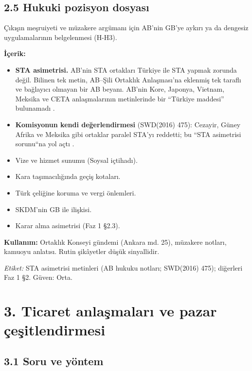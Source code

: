 \hypertarget{02c_hazirlik-25-hukuki-pozisyon-dosyasux131}{%
\subsection{2.5 Hukuki pozisyon dosyası}\label{02c_hazirlik-25-hukuki-pozisyon-dosyasux131}}

Çıkışın meşruiyeti ve müzakere argümanı için AB'nin GB'ye aykırı ya da dengesiz uygulamalarının belgelenmesi (H-H3).

\textbf{İçerik:}

\begin{itemize}
\tightlist
\item
  \textbf{STA asimetrisi.} AB'nin STA ortakları Türkiye ile STA yapmak zorunda değil. Bilinen tek metin, AB--Şili Ortaklık Anlaşması'na eklenmiş tek taraflı ve bağlayıcı olmayan bir AB beyanı. AB'nin Kore, Japonya, Vietnam, Meksika ve CETA anlaşmalarının metinlerinde bir ``Türkiye maddesi'' bulunamadı \etiketV{}.
\item
  \textbf{Komisyonun kendi değerlendirmesi} (SWD(2016) 475): Cezayir, Güney Afrika ve Meksika gibi ortaklar paralel STA'yı reddetti; bu ``STA asimetrisi sorunu``na yol açtı \etiketV{}.
\item
  Vize ve hizmet sunumu (Soysal içtihadı).
\item
  Kara taşımacılığında geçiş kotaları.
\item
  Türk çeliğine koruma ve vergi önlemleri.
\item
  SKDM'nin GB ile ilişkisi.
\item
  Karar alma asimetrisi (Faz 1 §2.3).
\end{itemize}

\textbf{Kullanım:} Ortaklık Konseyi gündemi (Ankara md. 25), müzakere notları, kamuoyu anlatısı. Rutin şikâyetler düşük sinyallidir.

\emph{Etiket:} \etiketV{} STA asimetrisi metinleri (AB hukuku notları; SWD(2016) 475); diğerleri Faz 1 §2. Güven: Orta.

\hypertarget{02c_hazirlik-3-ticaret-anlaux15fmalarux131-ve-pazar-uxe7eux15fitlendirmesi}{%
\section{3. Ticaret anlaşmaları ve pazar çeşitlendirmesi}\label{02c_hazirlik-3-ticaret-anlaux15fmalarux131-ve-pazar-uxe7eux15fitlendirmesi}}

\hypertarget{02c_hazirlik-31-soru-ve-yuxf6ntem}{%
\subsection{3.1 Soru ve yöntem}\label{02c_hazirlik-31-soru-ve-yuxf6ntem}}

